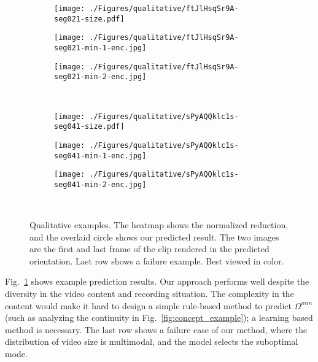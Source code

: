 \documentclass[journal,transmag]{IEEEtran}
\begin{document}
\begin{figure}[t]
\begin{subfigure}[c]{0.31\linewidth}
        \centering
        \texttt{[image: ./Figures/qualitative/ftJlHsqSr9A-seg021-size.pdf]}
    \end{subfigure}
    \begin{subfigure}[c]{0.33\linewidth}
        \centering
        \texttt{[image: ./Figures/qualitative/ftJlHsqSr9A-seg021-min-1-enc.jpg]}
    \end{subfigure}
    \begin{subfigure}[c]{0.33\linewidth}
        \centering
        \texttt{[image: ./Figures/qualitative/ftJlHsqSr9A-seg021-min-2-enc.jpg]}
    \end{subfigure}
    \\
    \begin{subfigure}[c]{0.31\linewidth}
        \centering
        \texttt{[image: ./Figures/qualitative/sPyAQQklc1s-seg041-size.pdf]}
    \end{subfigure}
    \begin{subfigure}[c]{0.33\linewidth}
        \centering
        \texttt{[image: ./Figures/qualitative/sPyAQQklc1s-seg041-min-1-enc.jpg]}
    \end{subfigure}
    \begin{subfigure}[c]{0.33\linewidth}
        \centering
        \texttt{[image: ./Figures/qualitative/sPyAQQklc1s-seg041-min-2-enc.jpg]}
    \end{subfigure}
    \\
    \caption{
        Qualitative examples.
        The heatmap shows the normalized reduction, and the overlaid circle shows our predicted result.
        The two images are the first and last frame of the clip rendered in the predicted orientation.
        Last row shows a failure example.
        Best viewed in color.
    }
    \label{fig:qualitative}
\end{figure}

Fig.~\ref{fig:qualitative} shows example prediction results.
Our approach performs well despite the diversity in the video content and recording situation.
The complexity in the content would make it hard to design a simple rule-based method to predict $\Omega^{min}$
(such as analyzing the continuity in Fig.~\ref{fig:concept_example}); a learning based method is necessary.
The last row shows a failure case of our method,
where the distribution of video size is multimodal,
and the model selects the suboptimal mode.
\end{document}
